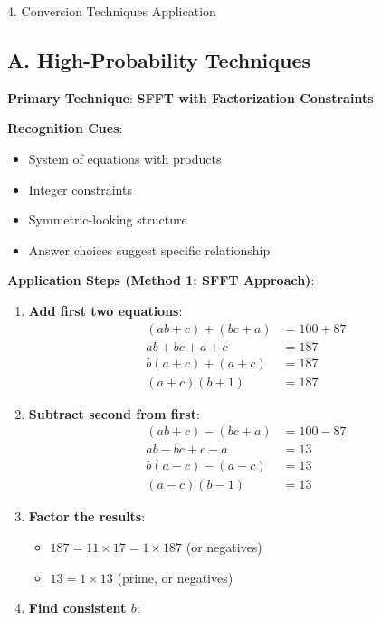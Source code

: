 \documentclass[12pt]{article}
\begin{document}
\begin{conversionbox}{4. Conversion Techniques Application}

\subsection*{A. High-Probability Techniques}

\textbf{Primary Technique}: \textbf{SFFT with Factorization Constraints}

\textbf{Recognition Cues}:
\begin{itemize}
    \item System of equations with products
    \item Integer constraints
    \item Symmetric-looking structure
    \item Answer choices suggest specific relationship
\end{itemize}

\textbf{Application Steps (Method 1: SFFT Approach)}:
\begin{enumerate}
    \item \textbf{Add first two equations}:
    \begin{align*}
    (ab + c) + (bc + a) &= 100 + 87\\
    ab + bc + a + c &= 187\\
    b(a+c) + (a+c) &= 187\\
    (a+c)(b+1) &= 187
    \end{align*}
    
    \item \textbf{Subtract second from first}:
    \begin{align*}
    (ab + c) - (bc + a) &= 100 - 87\\
    ab - bc + c - a &= 13\\
    b(a-c) - (a-c) &= 13\\
    (a-c)(b-1) &= 13
    \end{align*}
    
    \item \textbf{Factor the results}:
    \begin{itemize}
        \item $187 = 11 \times 17 = 1 \times 187$ (or negatives)
        \item $13 = 1 \times 13$ (prime, or negatives)
    \end{itemize}
    
    \item \textbf{Find consistent $b$}:
    

\end{enumerate}
\end{conversionbox}
\end{document}
